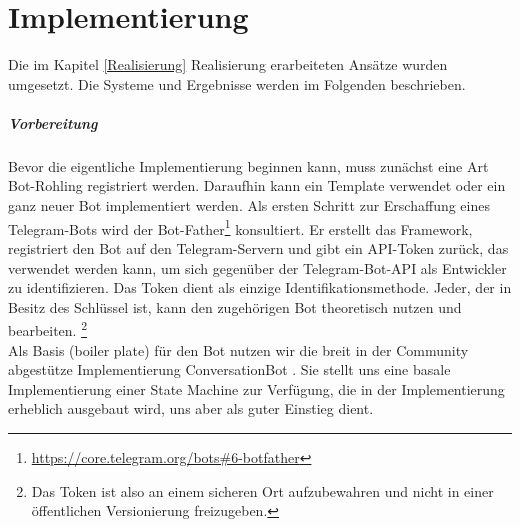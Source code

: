 \chapter{Implementierung} \label{Implementierung}


    Die im Kapitel \ref*{Realisierung} Realisierung erarbeiteten Ansätze wurden umgesetzt. Die Systeme und Ergebnisse werden im Folgenden beschrieben. 
    
    \paragraph{Vorbereitung}
    Bevor die eigentliche Implementierung beginnen kann, muss zunächst eine Art Bot-Rohling registriert werden. Daraufhin kann ein Template verwendet oder ein ganz neuer Bot implementiert werden. Als ersten Schritt zur Erschaffung eines Telegram-Bots wird der Bot-Father\footnote{\url{https://core.telegram.org/bots\#6-botfather}} konsultiert. Er erstellt das Framework, registriert den Bot auf den Telegram-Servern und gibt ein API-Token zurück, das verwendet werden kann, um sich gegenüber der Telegram-Bot-API als Entwickler zu identifizieren. \cite{telegramAPI} Das Token dient als einzige Identifikationsmethode. Jeder, der in Besitz des Schlüssel ist, kann den zugehörigen Bot theoretisch nutzen und bearbeiten. \footnote{Das Token ist also an einem sicheren Ort aufzubewahren und nicht in einer öffentlichen Versionierung freizugeben.} \\
    Als Basis (boiler plate) für den Bot nutzen wir die breit in der Community abgestütze Implementierung ConversationBot \cite{conversationBot}. Sie stellt uns eine basale Implementierung einer State Machine zur Verfügung, die in der Implementierung erheblich ausgebaut wird, uns aber als guter Einstieg dient.






